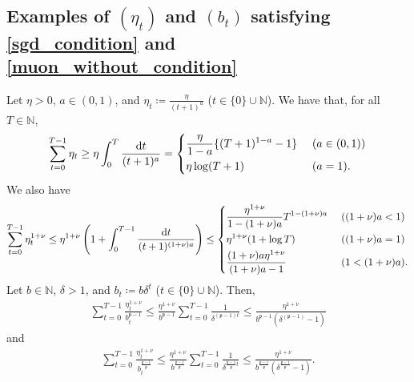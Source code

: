 \documentclass[twoside,11pt]{article}
\begin{document}
\subsection{Examples of $(\eta_t)$ and $(b_t)$ satisfying \eqref{sgd_condition} and \eqref{muon_without_condition}}
Let $\eta > 0$, $a \in (0,1)$, and $\eta_t \coloneqq \frac{\eta}{(t+1)^a}$ ($t \in \{0\} \cup \mathbb{N}$). We have that, for all $T \in \mathbb{N}$,
\begin{align*}
\sum_{t=0}^{T-1} \eta_t 
\geq
\eta \int_0^T \frac{\mathrm{d}t}{(t+1)^a}
= 
\begin{dcases}
\frac{\eta}{1 - a} \{ (T+1)^{1-a} -1  \} &\text{ } (a \in (0,1))\\
\eta \log (T+1) &\text{ } (a = 1).
\end{dcases}
\end{align*}
We also have 
\begin{align*}
\sum_{t=0}^{T-1} \eta_t^{1 + \nu} 
\leq 
\eta^{1+\nu} \left( 1 + \int_0^{T-1} \frac{\mathrm{d}t}{(t+1)^{(1 + \nu)a}} \right)
\leq
\begin{dcases}
\frac{\eta^{1+\nu}}{1 - (1 + \nu)a} T^{1 - (1 + \nu)a} &\text{ } ((1+ \nu)a < 1 )\\
\eta^{1+\nu} (1 + \log T) &\text{ } ((1+ \nu)a = 1)\\
\frac{(1 + \nu)a \eta^{1 + \nu}}{(1 + \nu)a - 1} &\text{ } (1 < (1+ \nu)a).
\end{dcases}
\end{align*}
Let $b \in \mathbb{N}$, $\delta > 1$, and $b_t \coloneqq b \delta^t$ ($t \in \{0\} \cup \mathbb{N}$). Then, 
\begin{align*}
\sum_{t=0}^{T-1} \frac{\eta_t^{1 + \nu}}{b_t^{\mathfrak{p} - 1}}
\leq 
\frac{\eta^{1+\nu}}{b^{\mathfrak{p} - 1}} \sum_{t=0}^{T-1} \frac{1}{\delta^{(\mathfrak{p} - 1)t}}
\leq 
\frac{\eta^{1+\nu}}{b^{\mathfrak{p} - 1} (\delta^{(\mathfrak{p} - 1)} -1) } 
\end{align*}
and 
\begin{align*}
\sum_{t=0}^{T-1} \frac{\eta_t^{1 + \nu}}{
b_t^{\frac{\mathfrak{p} - 1}{\mathfrak{p}}}}
\leq 
\frac{\eta^{1+\nu}}{b^{\frac{\mathfrak{p} - 1}{\mathfrak{p}}}} \sum_{t=0}^{T-1} \frac{1}{\delta^{\frac{\mathfrak{p} - 1}{\mathfrak{p}} t}}
\leq 
\frac{\eta^{1+\nu}}{b^{\frac{\mathfrak{p} - 1}{\mathfrak{p}}} (\delta^{\frac{\mathfrak{p} - 1}{\mathfrak{p}}} -1) }. 
\end{align*}
\end{document}
